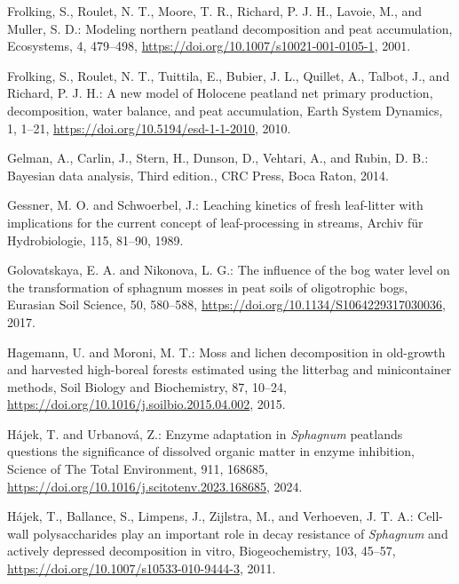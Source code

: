 \documentclass[
  12pt,
]{article}
\newlength{\cslhangindent}
\newlength{\cslentryspacingunit} %
\newenvironment{CSLReferences}[2] %
 {%
  \setlength{\parindent}{0pt}
  \ifodd #1
  \let\oldpar\par
  \def\par{\hangindent=\cslhangindent\oldpar}
  \fi
  \setlength{\parskip}{#2\cslentryspacingunit}
 }%
 {}
\begin{document}
\begin{CSLReferences}{0}{0}
\leavevmode{}%
Frolking, S., Roulet, N. T., Moore, T. R., Richard, P. J. H., Lavoie, M., and Muller, S. D.: Modeling northern peatland decomposition and peat accumulation, Ecosystems, 4, 479--498, \url{https://doi.org/10.1007/s10021-001-0105-1}, 2001.

\leavevmode{}%
Frolking, S., Roulet, N. T., Tuittila, E., Bubier, J. L., Quillet, A., Talbot, J., and Richard, P. J. H.: A new model of {Holocene} peatland net primary production, decomposition, water balance, and peat accumulation, Earth System Dynamics, 1, 1--21, \url{https://doi.org/10.5194/esd-1-1-2010}, 2010.

\leavevmode{}%
Gelman, A., Carlin, J., Stern, H., Dunson, D., Vehtari, A., and Rubin, D. B.: Bayesian data analysis, Third edition., CRC Press, Boca Raton, 2014.

\leavevmode{}%
Gessner, M. O. and Schwoerbel, J.: Leaching kinetics of fresh leaf-litter with implications for the current concept of leaf-processing in streams, Archiv f{ü}r Hydrobiologie, 115, 81--90, 1989.

\leavevmode{}%
Golovatskaya, E. A. and Nikonova, L. G.: The influence of the bog water level on the transformation of sphagnum mosses in peat soils of oligotrophic bogs, Eurasian Soil Science, 50, 580--588, \url{https://doi.org/10.1134/S1064229317030036}, 2017.

\leavevmode{}%
Hagemann, U. and Moroni, M. T.: Moss and lichen decomposition in old-growth and harvested high-boreal forests estimated using the litterbag and minicontainer methods, Soil Biology and Biochemistry, 87, 10--24, \url{https://doi.org/10.1016/j.soilbio.2015.04.002}, 2015.

\leavevmode{}%
Hájek, T. and Urbanová, Z.: Enzyme adaptation in {\emph{Sphagnum}} peatlands questions the significance of dissolved organic matter in enzyme inhibition, Science of The Total Environment, 911, 168685, \url{https://doi.org/10.1016/j.scitotenv.2023.168685}, 2024.

\leavevmode{}%
Hájek, T., Ballance, S., Limpens, J., Zijlstra, M., and Verhoeven, J. T. A.: Cell-wall polysaccharides play an important role in decay resistance of {\emph{Sphagnum}} and actively depressed decomposition in vitro, Biogeochemistry, 103, 45--57, \url{https://doi.org/10.1007/s10533-010-9444-3}, 2011.


\end{CSLReferences}
\end{document}

